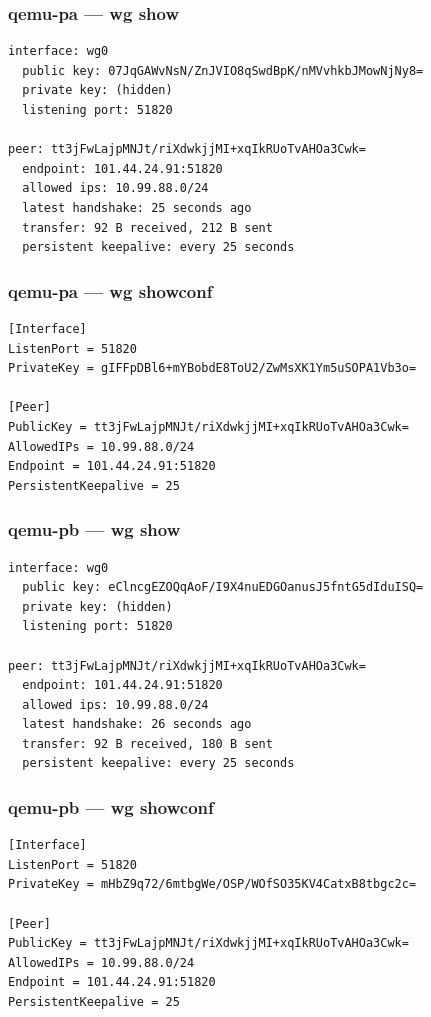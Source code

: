 \documentclass[11pt,a4paper]{article}
\begin{document}
\subsubsection*{qemu-pa — wg show}
\begin{lstlisting}
interface: wg0
  public key: 07JqGAWvNsN/ZnJVIO8qSwdBpK/nMVvhkbJMowNjNy8=
  private key: (hidden)
  listening port: 51820

peer: tt3jFwLajpMNJt/riXdwkjjMI+xqIkRUoTvAHOa3Cwk=
  endpoint: 101.44.24.91:51820
  allowed ips: 10.99.88.0/24
  latest handshake: 25 seconds ago
  transfer: 92 B received, 212 B sent
  persistent keepalive: every 25 seconds

\end{lstlisting}

\subsubsection*{qemu-pa — wg showconf}
\begin{lstlisting}
[Interface]
ListenPort = 51820
PrivateKey = gIFFpDBl6+mYBobdE8ToU2/ZwMsXK1Ym5uSOPA1Vb3o=

[Peer]
PublicKey = tt3jFwLajpMNJt/riXdwkjjMI+xqIkRUoTvAHOa3Cwk=
AllowedIPs = 10.99.88.0/24
Endpoint = 101.44.24.91:51820
PersistentKeepalive = 25

\end{lstlisting}

\subsubsection*{qemu-pb — wg show}
\begin{lstlisting}
interface: wg0
  public key: eClncgEZOQqAoF/I9X4nuEDGOanusJ5fntG5dIduISQ=
  private key: (hidden)
  listening port: 51820

peer: tt3jFwLajpMNJt/riXdwkjjMI+xqIkRUoTvAHOa3Cwk=
  endpoint: 101.44.24.91:51820
  allowed ips: 10.99.88.0/24
  latest handshake: 26 seconds ago
  transfer: 92 B received, 180 B sent
  persistent keepalive: every 25 seconds

\end{lstlisting}

\subsubsection*{qemu-pb — wg showconf}
\begin{lstlisting}
[Interface]
ListenPort = 51820
PrivateKey = mHbZ9q72/6mtbgWe/OSP/WOfSO35KV4CatxB8tbgc2c=

[Peer]
PublicKey = tt3jFwLajpMNJt/riXdwkjjMI+xqIkRUoTvAHOa3Cwk=
AllowedIPs = 10.99.88.0/24
Endpoint = 101.44.24.91:51820
PersistentKeepalive = 25

\end{lstlisting}
\end{document}
